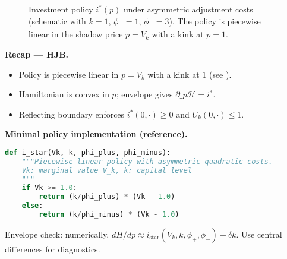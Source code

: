 ﻿\documentclass[11pt,letterpaper,oneside]{article}
\numberwithin{equation}{section}
\newcommand{\1}{\mathbf{1}}
\begin{document}
\begin{figure}[ht]
\centering
{}
\caption{Investment policy $i^*(p)$ under asymmetric adjustment costs (schematic with $k=1$, $\phi_+=1$, $\phi_-=3$). The policy is piecewise linear in the shadow price $p=V_k$ with a kink at $p=1$.}
\label{fig:policy_ip}
\end{figure}

\begin{tcolorbox}[didacticstyle]
\textbf{Recap --- HJB.}
\begin{itemize}[leftmargin=1.15em,itemsep=0.2em]
  \item Policy is piecewise linear in $p=V_k$ with a kink at $1$ (see ).
  \item Hamiltonian is convex in $p$; envelope gives $\partial\_p\mathcal H=i^*$.
  \item Reflecting boundary enforces $i^*(0,\cdot)\ge0$ and $U_k(0,\cdot)\le1$.
\end{itemize}
\end{tcolorbox}

\begin{tcolorbox}[didacticstyle]
\textbf{Minimal policy implementation (reference).}
\begin{lstlisting}[language=Python]
def i_star(Vk, k, phi_plus, phi_minus):
    """Piecewise-linear policy with asymmetric quadratic costs.
    Vk: marginal value V_k, k: capital level
    """
    if Vk >= 1.0:
        return (k/phi_plus) * (Vk - 1.0)
    else:
        return (k/phi_minus) * (Vk - 1.0)
\end{lstlisting}
Envelope check: numerically, \(dH/dp \approx i_{\mathrm{star}}(V_k,k,\phi_+,\phi_-) - \delta k\). Use central differences for diagnostics.
\end{tcolorbox}
\end{document}
